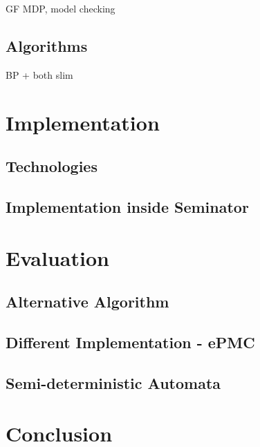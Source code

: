\documentclass[
	digital
nolof, nolot
]{fithesis3}
\begin{document}
		
		GF MDP, model checking
		\section{Algorithms}
		BP + both slim 
	\chapter{Implementation}
		\section{Technologies}
		\section{Implementation inside Seminator}
	\chapter{Evaluation}
		\section{Alternative Algorithm}
		\section{Different Implementation - ePMC}
		\section{Semi-deterministic Automata}
	\chapter{Conclusion}
\end{document}

